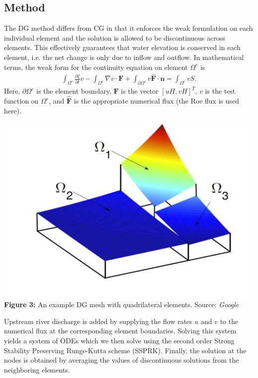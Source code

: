 \documentclass[american]{article}
\newcommand\pd[2]{\frac{\partial #1}{\partial #2}}
\newcommand\inte{\int_{\Omega^e}}
\newcommand\pinte{\int_{\partial\Omega^e}}
\newcommand\ve[1]{\mathbf{#1}}
\begin{document}
\begin{multicols}{3}
\section*{Method}
\noindent The DG method differs from CG in that it enforces the weak formulation on each individual element and the solution is allowed to be discontinuous across elements. This effectively guarantees that water elevation is conserved in each element, i.e. the net change is only due to inflow and outflow. In mathematical terms, the weak form for the continuity equation on element $\Omega^e$ is
\begin{align*}
  \inte \pd{\zeta}{t} v - \inte \nabla v \cdot \ve{F} + \pinte v \ve{\widehat{F}} \cdot \ve{n}  = \inte v S.
\end{align*}
Here, $\partial \Omega^e$ is the element boundary, $\ve{F}$ is the vector $[uH, vH]^T$, $v$ is the test function on $\Omega^e$, and $\ve{\widehat{F}}$ is the appropriate numerical flux (the Roe flux is used here).
\begin{center}
  \vspace{5mm}
    \includegraphics[width=0.55 \linewidth]{media/dg.png} \\
    \textbf{Figure 3:} An example DG mesh with quadrilateral elements. Source: \textit{Google}
\end{center}
Upstream river discharge is added by supplying the flow rates $u$ and $v$ to the numerical flux at the corresponding element boundaries.
Solving this system yields a system of ODEs which we then solve using the second order Strong Stability Preserving Runge-Kutta scheme (SSPRK).
Finally, the solution at the nodes is obtained by averaging the values of discontinuous solutions from the neighboring elements.



\end{multicols}
\end{document}
